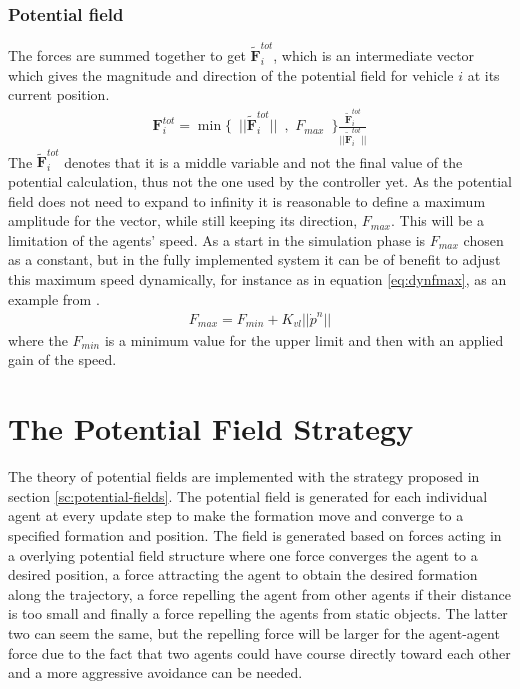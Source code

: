\subsubsection{Potential field}
The forces are summed together to get
$\tilde{\mathbf{F}}_i^{tot}$, which is an intermediate vector which gives the magnitude and direction of the
potential field for vehicle $i$ at its current position.
\begin{align}
  \mathbf{F}_i^{tot} = \min\{\,\,\,||\tilde{\mathbf{F}}_i^{tot}||\,\,\,,\,\,F_{max}\,\,\,\}\frac{\tilde{\mathbf{F}}_i^{tot}}{||\tilde{\mathbf{F}}_i^{tot}||}
\end{align}
The $\tilde{\mathbf{F}}_i^{tot}$ denotes that it is a middle variable and not the final value of the potential calculation, thus not the one used by the controller yet.
As the potential field does not need to expand to infinity it is reasonable to define a maximum amplitude for the vector, while still keeping its direction, $F_{max}$. This will be a limitation of the agents' speed. As a start in the simulation phase is $F_{max}$ chosen as a constant, but in the fully implemented system it can be of benefit to adjust this maximum speed dynamically, for instance as in equation \ref{eq:dynfmax}, as an example from \citep{UAVff3dpf}.
\begin{align}
F_{max} = F_{min} + K_{vl}||\dot{p}^n||
\label{eq:dynfmax}
\end{align}
where the $F_{min}$ is a minimum value for the upper limit and then with an applied gain of the speed.


\section{The Potential Field Strategy}
The theory of potential fields are implemented with the strategy
proposed in section \ref{sc:potential-fields}. The potential field is
generated for each individual agent at every update step to make the
formation move and converge to a specified formation and position. The
field is generated based on forces acting in a overlying potential
field structure where one force converges the agent to a desired
position, a force attracting the agent to obtain the desired formation
along the trajectory, a force repelling the agent from other agents if
their distance is too small and finally a force repelling the agents
from static objects. The latter two can seem the same, but the
repelling force will be larger for the agent-agent force due to the
fact that two agents could have course directly toward each other and
a more aggressive avoidance can be needed.

